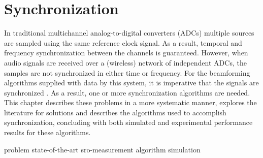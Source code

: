\documentclass[a4paper, notitlepage]{report}
\begin{document}
\chapter{Synchronization}
\label{ch:synchronization}
In traditional multichannel analog-to-digital converters (ADCs) multiple sources are sampled using the same reference clock signal. As a result, temporal and frequency synchronization between the channels is guaranteed. 
However, when audio signals are received over a (wireless) network of independent ADCs, the samples are not synchronized in either time or frequency. For the beamforming algorithms supplied with data by this system, it is imperative that the signals are synchronized \cite{cherkassky2014}. As a result, one or more synchronization algorithms are needed. This chapter describes these problems in a more systematic manner, explores the literature for solutions and describes the algorithms used to accomplish synchronization, concluding with both simulated and experimental performance results for these algorithms.

{problem}		%
{state-of-the-art}	%
{sro-measurement}	%
{algorithm}		%
{simulation}	%
\end{document}
